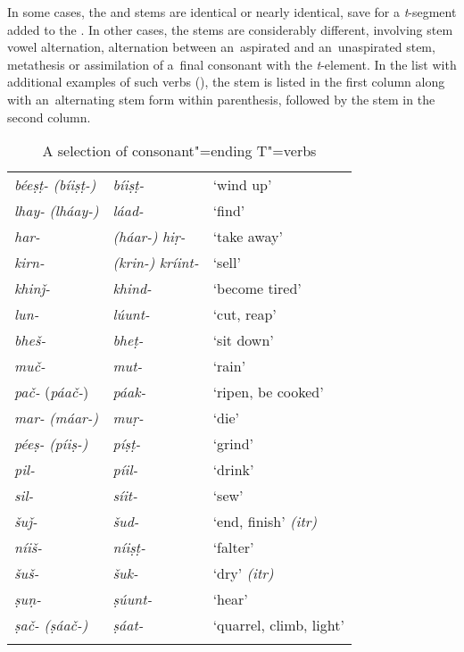 In some cases, the  and  stems are identical or nearly identical, save for a \textit{t}-segment added to the . In other cases, the stems are considerably different, involving stem vowel alternation, alternation between an~aspirated and an~unaspirated stem, metathesis or assimilation of a~final consonant with the  \textit{t}-element. In the list with additional examples of such verbs (), the  stem is listed in the first column along with an~alternating  stem form within parenthesis, followed by the  stem in the second column.


\begin{table}[t]
\caption{A selection of consonant"=ending T"=verbs}
\begin{tabularx}{\textwidth}{ l@{\hspace{40pt}} l@{\hspace{40pt}} Q }
\lsptoprule
\textit{béeṣṭ-} \textit{(bíiṣṭ-)} &
\textit{bíiṣṭ-}	&
`wind up' \\
\textit{lhay-} \textit{(lháay-)}	&
\textit{láad-}	&
`find' \\
\textit{har-} &
\textit{(háar-)}	\textit{hiṛ-}	&
`take away' \\
\textit{kirn-} &
\textit{(krin-)} \textit{kríint-}	&
`sell' \\
\textit{khinǰ-}&
\textit{khind-}	&
`become tired' \\
\textit{lun-} &
\textit{lúunt-}	&
`cut, reap' \\
\textit{bheš-} &
\textit{bheṭ-}	&
`sit down' \\
\textit{muč-} &
\textit{mut-}	&
`rain' \\
\textit{\textit{pač-}} (\textit{páač-})	&
\textit{páak-}	&
`ripen, be cooked' \\
\textit{mar-} \textit{(máar-)}&
\textit{muṛ-}	&
`die' \\
\textit{péeṣ-} \textit{(píiṣ-)} &
\textit{píṣṭ-}	&
`grind' \\
\textit{pil-} &\textit{píil-}	&
`drink' \\
\textit{sil-} &\textit{síit-}	&
`sew' \\
\textit{šuǰ-} &\textit{šud-}	&
`end, finish' \textit{(itr)}\\
\textit{níiš-} &\textit{níiṣṭ-}	&
`falter' \\
\textit{šuš-} &\textit{šuk-}	&
`dry'  \textit{(itr)} \\
\textit{ṣuṇ-} &\textit{ṣúunt-}	&
`hear' \\
\textit{ṣač-} \textit{(ṣáač-)} &	\textit{ṣáat-}	&
`quarrel, climb, light' \\\lspbottomrule
\end{tabularx}
\label{tab:8-tc}
\end{table}

